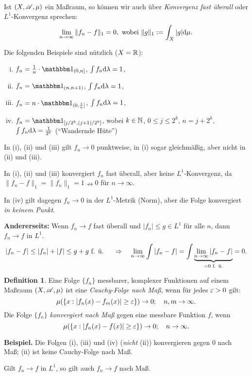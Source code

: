 \documentclass[
 a4paper,
 12pt,
 parskip=half
 ]{scrreprt}
\theoremstyle{plain}
\theoremstyle{definition}
\newtheorem{defn}[thm]{Definition}
\numberwithin{equation}{section}
\begin{document}
Ist $(X, \mathscr{A}, \mu)$ ein Maßraum, so können wir auch über \emph{Konvergenz fast überall} oder $L^1$-Konvergenz sprechen:
\[ \lim_{n \to \infty} \| f_n - f \|_1 = 0, \text{ wobei } \| g \|_1 := \int_X |g| \mathrm{d} \mu. \]

Die folgenden Beispiele sind nützlich ($X = \mathbb{R}$):
\begin{enumerate}[(i)]
 \item $f_n = \rez{n} \cdot \ind_{(0, n]}$, $\int f_n \mathrm{d} \lambda = 1$,
 \item $f_n = \ind_{(n,n+1)}$, $\int f_n \mathrm{d} \lambda = 1$,
 \item $f_n = n \cdot \ind_{(0,\rez{n}]}$, $\int f_n \mathrm{d} \lambda = 1$,
 \item $f_n = \ind_{[j/2^k,(j+1)/2^k]}$, wobei $k \in \mathbb{N}$, $0 \le j \le 2^k$, $n = j + 2^k$, $\int f_n \mathrm{d} \lambda = \frac{1}{2^k}$ (``Wandernde Hüte'')
\end{enumerate}

In (i), (ii) und (iii) gilt $f_n \to 0$ punktweise, in (i) sogar gleichmäßig, aber nicht in (ii) und (iii).

In (i), (ii) und (iii) konvergiert $f_n$ fast überall, aber keine $L^1$-Konvergenz, da $\| f_n - f \|_1 = \| f_n \|_1 = 1 \nrightarrow 0$ für $n \to \infty$.

In (iv) gilt dagegen $f_n \to 0$ in der $L^1$-Metrik (Norm), aber die Folge konvergiert \emph{in keinem Punkt}.

\textbf{Andererseits:} Wenn $f_n \to f$ fast überall und $| f_n | \le g \in L^1$ für alle $n$, dann $f_n \to f$ in $L^1$.
\[ |f_n - f| \le | f_n | + | f | \le g + g \text{ f. ü. } \quad \Rightarrow \quad \lim_{n \to \infty} \int | f_n - f | = \int \underbrace{\lim_{n \to \infty} | f_n - f |}_{= 0 \text{ f. ü.}} = 0.\]

\begin{defn}
 Eine Folge $\{f_n\}$ messbarer, komplexer Funktionen auf einem Maßraum $(X,\mathscr{A},\mu)$ ist eine \emph{Cauchy-Folge nach Maß}, wenn für jedes $\varepsilon > 0$ gilt:
 \[ \mu( \{ x : | f_n(x) - f_m(x) | \ge \varepsilon \} ) \to 0; \quad n, m \to \infty. \]
 Die Folge $\{ f_n \}$ \emph{konvergiert nach Maß} gegen eine messbare Funktion $f$, wenn
 \[ \mu( \{ x : | f_n(x) - f(x) | \ge \varepsilon \} ) \to 0; \quad n \to \infty. \]
\end{defn}

\textbf{Beispiel.} Die Folgen (i), (iii) und (iv) (\emph{nicht} (ii)) konvergieren gegen 0 nach Maß; (ii) ist keine Cauchy-Folge nach Maß.

\begin{lem}
 Gilt $f_n \to f$ in $L^1$, so gilt auch $f_n \to f$ nach Maß.
\end{lem}
\end{document}
